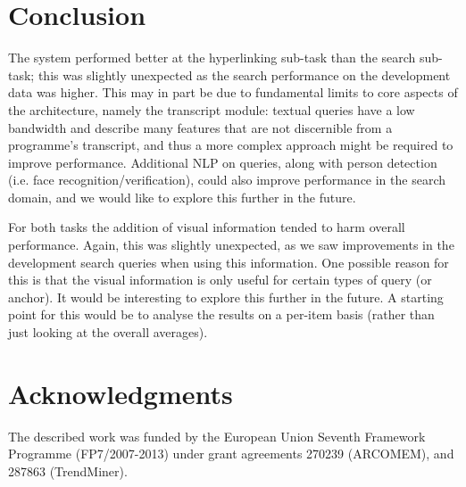 \documentclass{../acm_proc_article-me11_tweaked}
\begin{document}
\section{Conclusion}
The system performed better at the hyperlinking 
sub-task than the search sub-task; this was slightly unexpected as the search performance on the development data was higher. This may in part be due to fundamental limits to core aspects of the architecture, namely the transcript module: textual queries have a low bandwidth and describe many features that are not discernible from a 
programme's transcript, and thus a more complex approach might be required to improve 
performance. Additional NLP on queries, along with person 
detection (i.e. face recognition/verification), could also improve performance in the search domain, and we would like to explore this further in the future.

For both tasks the addition of visual information tended to harm overall performance. Again, this was slightly unexpected, as we saw improvements in the development search queries when using this information. One possible reason for this is that the visual information is only useful for certain types of query (or anchor). It would be interesting to explore this further in the future. A starting point for this would be to analyse the results on a per-item basis (rather than just looking at the overall averages).

\section{Acknowledgments}
The described work was funded by the European Union Seventh Framework Programme (FP7/2007-2013) under grant agreements 270239 (ARCOMEM), and 287863 (TrendMiner).



\end{document}
